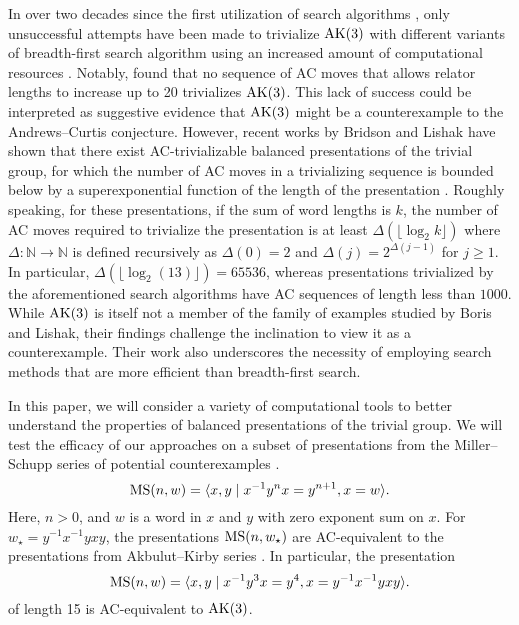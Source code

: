 In over two decades since the first utilization of search algorithms \cite{genetic, bfs-ac}, only unsuccessful attempts have been made to trivialize $\text{AK}(3)$ with different variants of breadth-first search algorithm using an increased amount of computational resources \cite{Bowman-McCaul, krawiec2016distance, Panteleev-Ushakov}.
Notably, \cite{Panteleev-Ushakov} found that no sequence of AC moves that allows relator lengths to increase up to 20 trivializes $\text{AK}(3)$.
This lack of success could be interpreted as suggestive evidence that $\text{AK}(3)$ might be a counterexample to the Andrews--Curtis conjecture.
However, recent works by Bridson and Lishak have shown that there exist AC-trivializable balanced presentations of the trivial group, for which the number of AC moves in a trivializing sequence is bounded below by a superexponential function of the length of the presentation \cite{Bridson, Lishak}.
Roughly speaking, for these presentations, if the sum of word lengths is $k$, the number of AC moves required to trivialize the presentation is at least $\Delta (\lfloor \log_2 k \rfloor)$ where $\Delta \colon \mathbb{N} \to \mathbb{N}$ is defined recursively as $\Delta(0) = 2$ and $\Delta (j) = 2^{\Delta(j-1)}$ for $j \geq 1$.
In particular, $\Delta (\lfloor \log_2 (13) \rfloor) = 65536$, whereas presentations trivialized by the aforementioned search algorithms have AC sequences of length less than $1000$.
While $\text{AK}(3)$ is itself not a member of the family of examples studied by Boris and Lishak, their findings challenge the inclination to view it as a counterexample.
Their work also underscores the necessity of employing search methods that are more efficient than breadth-first search.
\newline

In this paper, we will consider a variety of computational tools to better understand the properties of balanced presentations of the trivial group.
We will test the efficacy of our approaches on a subset of presentations from the Miller--Schupp series of potential counterexamples \cite{Miller--Schupp}.
\[
\text{MS}(n, w) = \langle x, y \mid x^{-1} y^n x = y^{n+1}, x = w\rangle.
\]
Here, $n > 0$, and $w$ is a word in $x$ and $y$ with zero exponent sum on $x$.
For $w_\star = y^{-1} x^{-1} y x y$, the presentations $\text{MS}(n, w_\star)$ are AC-equivalent to the presentations from Akbulut--Kirby series \cite{MMS}.
In particular, the presentation
\[
\text{MS}(n, w) = \langle x, y \mid x^{-1} y^3 x = y^{4}, x =  y^{-1} x^{-1} y x y\rangle.
\]
of length 15 is AC-equivalent to $\text{AK}(3)$.

